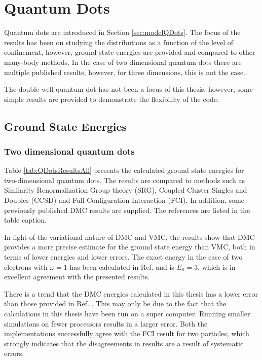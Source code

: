 \section{Quantum Dots}

Quantum dots are introduced in Section \ref{sec:modelQDots}. The focus of the results has been on studying the distributions as a function of the level of confinement, however, ground state energies are provided and compared to other many-body methods. In the case of two dimensional quantum dots there are multiple published results, however, for three dimensions, this is not the case. 

The double-well quantum dot has not been a focus of this thesis, however, some simple results are provided to demonstrate the flexibility of the code.

\subsection{Ground State Energies}

\subsubsection{Two dimensional quantum dots}

Table \ref{tab:QDotsResultsAll} presents the calculated ground state energies for two-dimensional quantum dots. The results are compared to methods such as Similarity Renormalization Group theory (SRG), Coupled Cluster Singles and Doubles (CCSD) and Full Configuration Interaction (FCI). In addition, some previously published DMC results are supplied. The references are listed in the table caption.

In light of the variational nature of DMC and VMC, the results show that DMC provides a more precise estimate for the ground state energy than VMC, both in terms of lower energies and lower errors. The exact energy in the case of two electrons with $\omega=1$ has been calculated in Ref. \cite{taut} and is $E_0 = 3$, which is in excellent agreement with the presented results.

There is a trend that the DMC energies calculated in this thesis has a lower error than those provided in Ref. \cite{MagnusArticle}. This may only be due to the fact that the calculations in this thesis have been run on a super computer. Running smaller simulations on fewer processors results in a larger error. Both the implementations successfully agree with the FCI result for two particles, which strongly indicates that the disagreements in results are a result of systematic errors.    

